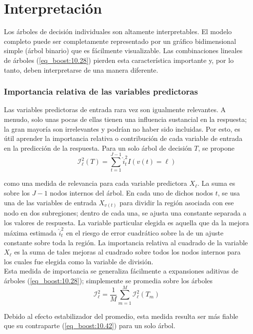 \section{Interpretación}

Los árboles de decisión individuales son altamente interpretables. El modelo completo puede ser completamente representado por un gráfico bidimensional simple (árbol binario) que es fácilmente visualizable. Las combinaciones lineales de árboles (\ref{eq_boost:10.28}) pierden esta característica importante y, por lo tanto, deben interpretarse de una manera diferente.

\subsubsection{Importancia relativa de las variables predictoras}

Las variables predictoras de entrada rara vez son igualmente relevantes. A menudo, solo unas pocas de ellas tienen una influencia sustancial en la respuesta; la gran mayoría son irrelevantes y podrían no haber sido incluidas. Por esto, es útil aprender la importancia relativa o contribución de cada variable de entrada en la predicción de la respuesta. Para un solo árbol de decisión $T$, se propone
\begin{equation}
\mathcal{I}_\ell^2 (T) = \sum_{t=1}^{J-1} \hat{i}_t^2 I(v(t) = \ell)
\label{eq_boost:10.42}
\end{equation}

\noindent como una medida de relevancia para cada variable predictora $X_\ell$. La suma es sobre los $J - 1$ nodos internos del árbol. En cada uno de dichos nodos $t$, se usa una de las variables de entrada $X_{v(t)}$ para dividir la región asociada con ese nodo en dos subregiones; dentro de cada una, se ajusta una constante separada a los valores de respuesta. La variable particular elegida es aquella que da la mejora máxima estimada $\hat{i}_t^2$ en el riesgo de error cuadrático sobre la de un ajuste constante sobre toda la región. La importancia relativa al cuadrado de la variable $X_\ell$ es la suma de tales mejoras al cuadrado sobre todos los nodos internos para los cuales fue elegida como la variable de división. \\

Esta medida de importancia se generaliza fácilmente a expansiones aditivas de árboles (\ref{eq_boost:10.28}); simplemente se promedia sobre los árboles
\begin{equation}
\mathcal{I}_\ell^2 = \frac{1}{M} \sum_{m=1}^{M} \mathcal{I}_\ell^2(T_m)
\label{eq_boost:10.43}
\end{equation}

Debido al efecto estabilizador del promedio, esta medida resulta ser más fiable que su contraparte (\ref{eq_boost:10.42}) para un solo árbol.